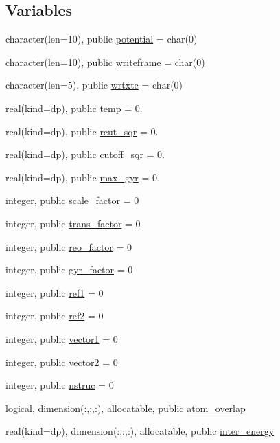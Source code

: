 \subsection*{Variables}
\begin{DoxyCompactItemize}
\item 
character(len=10), public \hyperlink{namespacemod__input__read_aaf9a85c22da4f3ae7bbcc9ba72d783dd}{potential} = char(0)
\item 
character(len=10), public \hyperlink{namespacemod__input__read_a02f99bb5470feaf35ab2fc228c797f64}{writeframe} = char(0)
\item 
character(len=5), public \hyperlink{namespacemod__input__read_af757b04e60563ace187ed465be839553}{wrtxtc} = char(0)
\item 
real(kind=dp), public \hyperlink{namespacemod__input__read_a584082766fe740d0c5f3975d3d44426b}{temp} = 0.
\item 
real(kind=dp), public \hyperlink{namespacemod__input__read_ad2ddb7a8a7af94da8a7d12c6e3ab9899}{rcut\+\_\+sqr} = 0.
\item 
real(kind=dp), public \hyperlink{namespacemod__input__read_a9ef9305fdc4e5164af51f0da464c36c0}{cutoff\+\_\+sqr} = 0.
\item 
real(kind=dp), public \hyperlink{namespacemod__input__read_a3f3cf0bf8b5ebc1886d493eda84eecf4}{max\+\_\+gyr} = 0.
\item 
integer, public \hyperlink{namespacemod__input__read_a55be21acb2dc4800c8d3cecf28e4166f}{scale\+\_\+factor} = 0
\item 
integer, public \hyperlink{namespacemod__input__read_ae958873dff0867f0aa04dbf6cd8a1166}{trans\+\_\+factor} = 0
\item 
integer, public \hyperlink{namespacemod__input__read_ab81a502be00c6796c9474d728db96041}{reo\+\_\+factor} = 0
\item 
integer, public \hyperlink{namespacemod__input__read_a76985d277087bc52f1b81814fe4c50bc}{gyr\+\_\+factor} = 0
\item 
integer, public \hyperlink{namespacemod__input__read_ae009fc7ba8243327aec0bed57f18b515}{ref1} = 0
\item 
integer, public \hyperlink{namespacemod__input__read_a72ae0812ca16c5cbb7eb3cbe12bafb58}{ref2} = 0
\item 
integer, public \hyperlink{namespacemod__input__read_a6e68357b53efca593488929b4554838d}{vector1} = 0
\item 
integer, public \hyperlink{namespacemod__input__read_a4f1ca96e94c5298b480fa8d43bb1b915}{vector2} = 0
\item 
integer, public \hyperlink{namespacemod__input__read_a8aa83854894f2e947a4e1015697433d0}{nstruc} = 0
\item 
logical, dimension(\+:,\+:,\+:), allocatable, public \hyperlink{namespacemod__input__read_ada662a2d234d567ce7da80355d2c9e21}{atom\+\_\+overlap}
\item 
real(kind=dp), dimension(\+:,\+:,\+:), allocatable, public \hyperlink{namespacemod__input__read_a59e3573d7d32b72bd699ac1708e70908}{inter\+\_\+energy}
\end{DoxyCompactItemize}


